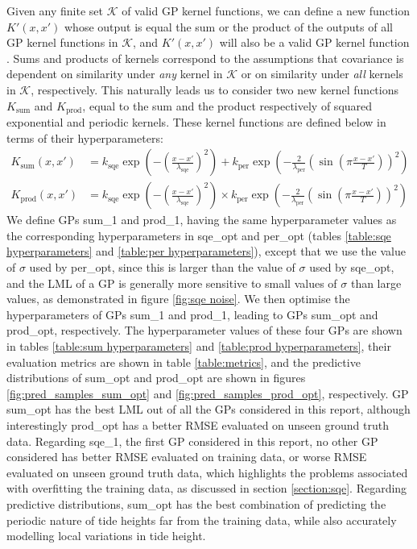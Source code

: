 Given any finite set $\mathcal{K}$ of valid GP kernel functions, we can define a new function $K'(x, x')$ whose output is equal the sum or the product of the outputs of all GP kernel functions in $\mathcal{K}$, and $K'(x, x')$ will also be a valid GP kernel function \cite{bishop2006pattern}. Sums and products of kernels correspond to the assumptions that covariance is dependent on similarity under \emph{any} kernel in $\mathcal{K}$ or on similarity under \emph{all} kernels in $\mathcal{K}$, respectively. This naturally leads us to consider two new kernel functions $K_\text{sum}$ and $K_\text{prod}$, equal to the sum and the product respectively of squared exponential and periodic kernels. These kernel functions are defined below in terms of their hyperparameters:
\begin{align}
    K_\text{sum}(x, x') &= k_{\text{sqe}} \exp\left( -\left( \frac{x - x'}{\lambda_{\text{sqe}}} \right)^2 \right) + k_{\text{per}} \exp\left( -\frac{2}{\lambda_{\text{per}}} \left( \sin \left( \pi \frac{x-x'}{T} \right) \right)^2 \right) \\
    K_\text{prod}(x, x') &= k_{\text{sqe}} \exp\left( -\left( \frac{x - x'}{\lambda_{\text{sqe}}} \right)^2 \right) \times k_{\text{per}} \exp\left( -\frac{2}{\lambda_{\text{per}}} \left( \sin \left( \pi \frac{x-x'}{T} \right) \right)^2 \right)
\end{align}
We define GPs sum\_1 and prod\_1, having the same hyperparameter values as the corresponding hyperparameters in sqe\_opt and per\_opt (tables \ref{table:sqe hyperparameters} and \ref{table:per hyperparameters}), except that we use the value of $\sigma$ used by per\_opt, since this is larger than the value of $\sigma$ used by sqe\_opt, and the LML of a GP is generally more sensitive to small values of $\sigma$ than large values, as demonstrated in figure \ref{fig:sqe noise}. We then optimise the hyperparameters of GPs sum\_1 and prod\_1, leading to GPs sum\_opt and prod\_opt, respectively. The hyperparameter values of these four GPs are shown in tables \ref{table:sum hyperparameters} and \ref{table:prod hyperparameters}, their evaluation metrics are shown in table \ref{table:metrics}, and the predictive distributions of sum\_opt and prod\_opt are shown in figures \ref{fig:pred_samples_sum_opt} and \ref{fig:pred_samples_prod_opt}, respectively. GP sum\_opt has the best LML out of all the GPs considered in this report, although interestingly prod\_opt has a better RMSE evaluated on unseen ground truth data. Regarding sqe\_1, the first GP considered in this report, no other GP considered has better RMSE evaluated on training data, or worse RMSE evaluated on unseen ground truth data, which highlights the problems associated with overfitting the training data, as discussed in section \ref{section:sqe}. Regarding predictive distributions, sum\_opt has the best combination of predicting the periodic nature of tide heights far from the training data, while also accurately modelling local variations in tide height.
